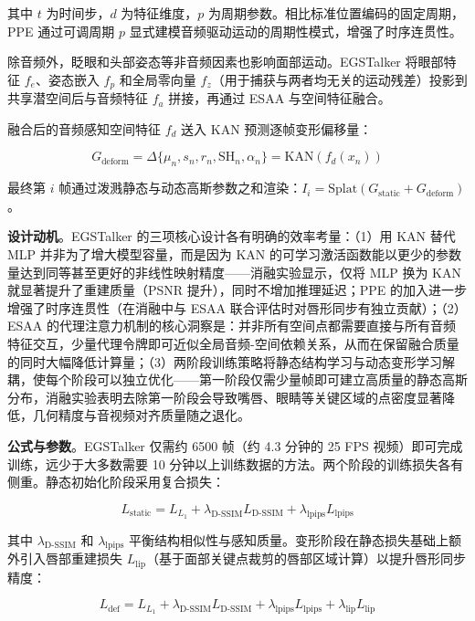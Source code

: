 其中 $t$ 为时间步，$d$ 为特征维度，$p$ 为周期参数。相比标准位置编码的固定周期，PPE 通过可调周期 $p$ 显式建模音频驱动运动的周期性模式，增强了时序连贯性。

除音频外，眨眼和头部姿态等非音频因素也影响面部运动。EGSTalker 将眼部特征 $f_e$、姿态嵌入 $f_p$ 和全局零向量 $f_z$（用于捕获与两者均无关的运动残差）投影到共享潜空间后与音频特征 $f_a$ 拼接，再通过 ESAA 与空间特征融合。

融合后的音频感知空间特征 $f_d$ 送入 KAN 预测逐帧变形偏移量：

\begin{equation}
    G_{\text{deform}} = \Delta\{\mu_n, s_n, r_n, \text{SH}_n, \alpha_n\} = \text{KAN}(f_d(x_n))
\end{equation}

最终第 $i$ 帧通过泼溅静态与动态高斯参数之和渲染：$I_i = \text{Splat}(G_{\text{static}} + G_{\text{deform}})$。

\textbf{设计动机}。EGSTalker 的三项核心设计各有明确的效率考量：（1）用 KAN 替代 MLP 并非为了增大模型容量，而是因为 KAN 的可学习激活函数能以更少的参数量达到同等甚至更好的非线性映射精度——消融实验显示，仅将 MLP 换为 KAN 就显著提升了重建质量（PSNR 提升），同时不增加推理延迟；PPE 的加入进一步增强了时序连贯性（在消融中与 ESAA 联合评估时对唇形同步有独立贡献）；（2）ESAA 的代理注意力机制的核心洞察是：并非所有空间点都需要直接与所有音频特征交互，少量代理令牌即可近似全局音频-空间依赖关系，从而在保留融合质量的同时大幅降低计算量；（3）两阶段训练策略将静态结构学习与动态变形学习解耦，使每个阶段可以独立优化——第一阶段仅需少量帧即可建立高质量的静态高斯分布，消融实验表明去除第一阶段会导致嘴唇、眼睛等关键区域的点密度显著降低，几何精度与音视频对齐质量随之退化。

\textbf{公式与参数}。EGSTalker 仅需约 6500 帧（约 4.3 分钟的 25 FPS 视频）即可完成训练，远少于大多数需要 10 分钟以上训练数据的方法。两个阶段的训练损失各有侧重。静态初始化阶段采用复合损失：

\begin{equation}
    L_{\text{static}} = L_{L_1} + \lambda_{\text{D-SSIM}} L_{\text{D-SSIM}} + \lambda_{\text{lpips}} L_{\text{lpips}}
\end{equation}

其中 $\lambda_{\text{D-SSIM}}$ 和 $\lambda_{\text{lpips}}$ 平衡结构相似性与感知质量。变形阶段在静态损失基础上额外引入唇部重建损失 $L_{\text{lip}}$（基于面部关键点裁剪的唇部区域计算）以提升唇形同步精度：

\begin{equation}
    L_{\text{def}} = L_{L_1} + \lambda_{\text{D-SSIM}} L_{\text{D-SSIM}} + \lambda_{\text{lpips}} L_{\text{lpips}} + \lambda_{\text{lip}} L_{\text{lip}}
\end{equation}

